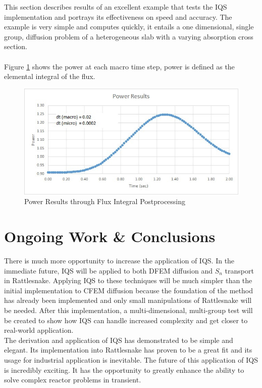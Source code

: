 \documentclass[11pt]{scrartcl}
\begin{document}
This section describes results of an excellent example that tests the IQS implementation and portrays its effectiveness on speed and accuracy.  The example is very simple and computes quickly, it entails a one dimensional, single group, diffusion problem of a heterogeneous slab with a varying absorption cross section.
\\ \\
Figure \ref{fig:power} shows the power at each macro time step, power is defined as the elemental integral of the flux.
\begin{figure}[h]
\includegraphics[width=\linewidth]{power_results.jpg}
\caption{Power Results through Flux Integral Postprocessing}
\label{fig:power}
\end{figure}

\section{Ongoing Work \& Conclusions}

There is much more opportunity to increase the application of IQS.  In the immediate future, IQS will be applied to both DFEM diffusion and $S_n$ transport in Rattlesnake.  Applying IQS to these techniques will be much simpler than the initial implementation to CFEM diffusion because the foundation of the method has already been implemented and only small manipulations of Rattlesnake will be needed.  After this implementation, a multi-dimensional, multi-group test will be created to show how IQS can handle increased complexity and get closer to real-world application.
\\
The derivation and application of IQS has demonstrated to be simple and elegant.  Its implementation into Rattlesnake has proven to be a great fit and its usage for industrial application is inevitable.  The future of this application of IQS is incredibly exciting.  It has the opportunity to greatly enhance the ability to solve complex reactor problems in transient.
\end{document}
